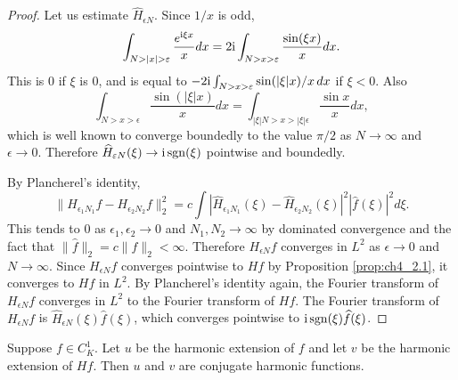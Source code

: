 \begin{proof}
Let us estimate $\widehat{H}_{\epsilon N}$. Since $1/x$ is odd,
\[
    \int_{N>|x|>\epsilon} \frac{e^{\im\xi x}}{x}dx = 2\im \int_{N>x>\epsilon} \frac{\sin(\xi x)}{x}dx.
\]
This is $0$ if $\xi$ is $0$, and is equal to $-2\mathrm{i}\int_{N>x>\varepsilon} \sin(|\xi|x)/x\, dx$ if $\xi < 0$. Also
\[
    \int_{N>x>\epsilon} \frac{\sin(|\xi| x)}{x}dx = \int_{|\xi|N>x>|\xi|\epsilon} \frac{\sin x}{x}dx,
\]
which is well known to converge boundedly to the value $\pi/2$ as $N \to \infty$ and $\epsilon \to 0$. Therefore $\widehat{H}_{\varepsilon N}(\xi) \to \mathrm{i}\operatorname{sgn}(\xi)$ pointwise and boundedly.

By Plancherel's identity,
\mpagebreak
\[
    \|H_{\epsilon_1 N_1}f - H_{\epsilon_2 N_2}f\|_2^2 = c\int |\widehat{H}_{\epsilon_1 N_1}(\xi) - \widehat{H}_{\epsilon_2 N_2}(\xi)|^2|\widehat{f}(\xi)|^2d\xi.
\]
This tends to $0$ as $\epsilon_1,\epsilon_2 \to 0$ and $N_1,N_2 \to \infty$ by dominated convergence and the fact that $\|\widehat{f}\|_2 = c\|f\|_2 < \infty$. Therefore $H_{\epsilon N}f$ converges in $L^2$ as $\epsilon \to 0$ and $N \to \infty$. Since $H_{\epsilon N}f$ converges pointwise to $Hf$ by Proposition \ref{prop:ch4_2.1}, it converges to $Hf$ in $L^2$. By Plancherel's identity again, the Fourier transform of $H_{\epsilon N}f$ converges in $L^2$ to the Fourier transform of $Hf$. The Fourier transform of $H_{\epsilon N}f$ is $\widehat{H}_{\epsilon N}(\xi)\widehat{f}(\xi)$, which converges pointwise to $\mathrm{i}\operatorname{sgn}(\xi)\widehat{f}(\xi)$.
\end{proof}

\begin{proposition}\label{prop:ch4_2.4}
Suppose $f \in C_K^1$. Let $u$ be the harmonic extension of $f$ and let $v$ be the harmonic extension of $Hf$. Then $u$ and $v$ are conjugate harmonic functions.
\end{proposition}

